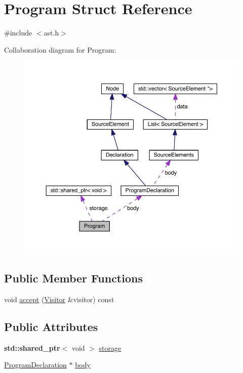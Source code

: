 \hypertarget{struct_program}{}\section{Program Struct Reference}
\label{struct_program}


{\ttfamily \#include $<$ast.\+h$>$}



Collaboration diagram for Program\+:
\nopagebreak
\begin{figure}[H]
\begin{center}
\leavevmode
\includegraphics[width=350pt]{struct_program__coll__graph}
\end{center}
\end{figure}
\subsection*{Public Member Functions}
\begin{DoxyCompactItemize}
\item 
void \hyperlink{struct_program_afbd3eb6a94760e56c25492ea1dc685ed}{accept} (\hyperlink{struct_visitor}{Visitor} \&visitor) const
\end{DoxyCompactItemize}
\subsection*{Public Attributes}
\begin{DoxyCompactItemize}
\item 
\textbf{ std\+::shared\+\_\+ptr}$<$ void $>$ \hyperlink{struct_program_aa25d5746067ab06823bf867e89dc8785}{storage}
\item 
\hyperlink{struct_program_declaration}{Program\+Declaration} $\ast$ \hyperlink{struct_program_aac5fe6649a517713e596e4ad5f45e4a4}{body}
\end{DoxyCompactItemize}



